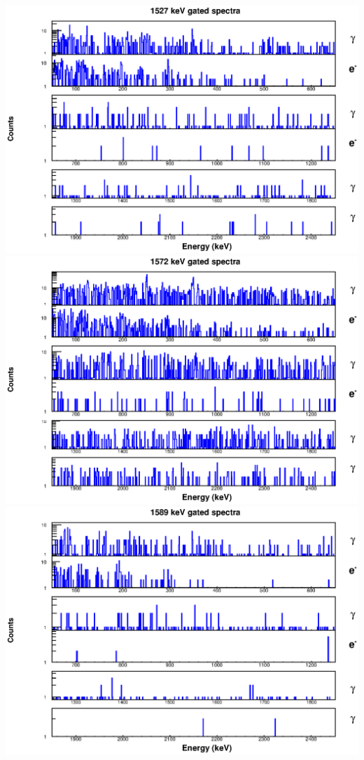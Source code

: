 \includegraphics[scale=0.8]{154Gd_Appendix/1527_combined.eps}
\includegraphics[scale=0.8]{154Gd_Appendix/1572_combined.eps}
\includegraphics[scale=0.8]{154Gd_Appendix/1589_combined.eps}
